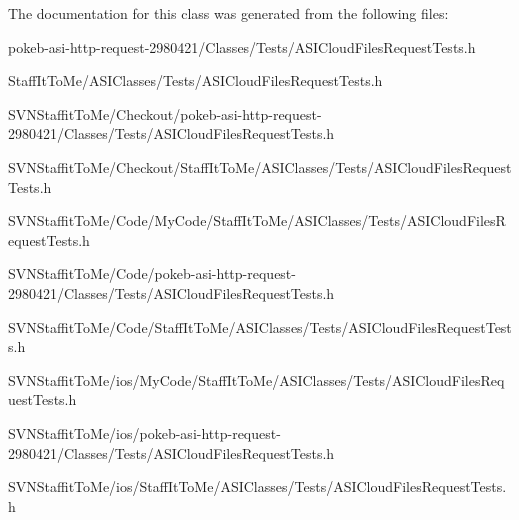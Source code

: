\-The documentation for this class was generated from the following files\-:\begin{DoxyCompactItemize}
\item 
pokeb-\/asi-\/http-\/request-\/2980421/\-Classes/\-Tests/\-A\-S\-I\-Cloud\-Files\-Request\-Tests.\-h\item 
\-Staff\-It\-To\-Me/\-A\-S\-I\-Classes/\-Tests/\-A\-S\-I\-Cloud\-Files\-Request\-Tests.\-h\item 
\-S\-V\-N\-Staffit\-To\-Me/\-Checkout/pokeb-\/asi-\/http-\/request-\/2980421/\-Classes/\-Tests/\-A\-S\-I\-Cloud\-Files\-Request\-Tests.\-h\item 
\-S\-V\-N\-Staffit\-To\-Me/\-Checkout/\-Staff\-It\-To\-Me/\-A\-S\-I\-Classes/\-Tests/\-A\-S\-I\-Cloud\-Files\-Request\-Tests.\-h\item 
\-S\-V\-N\-Staffit\-To\-Me/\-Code/\-My\-Code/\-Staff\-It\-To\-Me/\-A\-S\-I\-Classes/\-Tests/\-A\-S\-I\-Cloud\-Files\-Request\-Tests.\-h\item 
\-S\-V\-N\-Staffit\-To\-Me/\-Code/pokeb-\/asi-\/http-\/request-\/2980421/\-Classes/\-Tests/\-A\-S\-I\-Cloud\-Files\-Request\-Tests.\-h\item 
\-S\-V\-N\-Staffit\-To\-Me/\-Code/\-Staff\-It\-To\-Me/\-A\-S\-I\-Classes/\-Tests/\-A\-S\-I\-Cloud\-Files\-Request\-Tests.\-h\item 
\-S\-V\-N\-Staffit\-To\-Me/ios/\-My\-Code/\-Staff\-It\-To\-Me/\-A\-S\-I\-Classes/\-Tests/\-A\-S\-I\-Cloud\-Files\-Request\-Tests.\-h\item 
\-S\-V\-N\-Staffit\-To\-Me/ios/pokeb-\/asi-\/http-\/request-\/2980421/\-Classes/\-Tests/\-A\-S\-I\-Cloud\-Files\-Request\-Tests.\-h\item 
\-S\-V\-N\-Staffit\-To\-Me/ios/\-Staff\-It\-To\-Me/\-A\-S\-I\-Classes/\-Tests/\-A\-S\-I\-Cloud\-Files\-Request\-Tests.\-h\end{DoxyCompactItemize}
